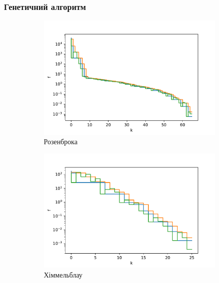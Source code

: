 \subsubsection*{Генетичний алгоритм}

\pagebreak
\begin{figure}[h!]
    \begin{subfigure}{0.5\textwidth}
        \includegraphics[width=\textwidth, trim=0cm 0cm 1.2cm 1cm, clip]{assets/NelderMead/rosenbrock_steps.pdf}
        \caption{Розенброка}
    \end{subfigure}
    \begin{subfigure}{0.5\textwidth}
        \includegraphics[width=\textwidth, trim=0cm 0cm 1.2cm 1cm, clip]{assets/NelderMead/himmelblau_steps.pdf}
        \caption{Хіммельблау}
    \end{subfigure}
    \begin{subfigure}{\textwidth}

\end{subfigure}
\end{figure}
